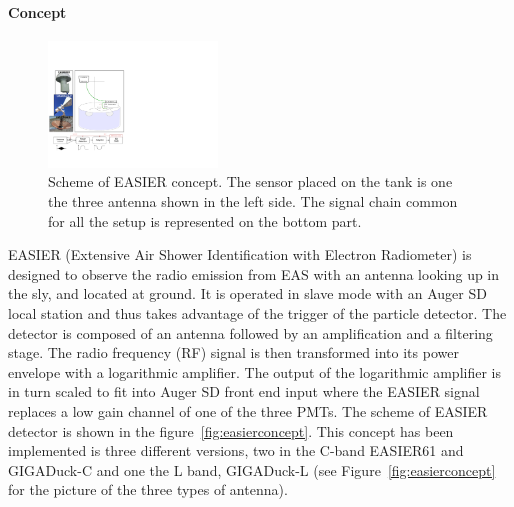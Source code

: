 \documentclass{PoS}
\begin{document}
\paragraph{Concept}
\begin{figure}
	  \begin{center}
\includegraphics[width=0.4\textwidth]{easierscheme.pdf}
	  \end{center}
  \label{fig:easierscheme}
  \caption{Scheme of EASIER concept. The sensor  placed on the tank is one the three antenna shown in the left side. The signal chain common for all the setup is represented on the bottom part.}
\end{figure}

EASIER (Extensive Air Shower Identification with Electron Radiometer) is designed to observe the radio emission from EAS with an antenna looking up in the sly, and located at ground. It is operated in slave mode with an Auger SD local station and thus takes advantage of the trigger of the particle detector. The detector is composed of an antenna followed by an amplification and a filtering stage. The radio frequency (RF) signal is then transformed into its power envelope with a logarithmic amplifier. The output of the logarithmic amplifier is in turn scaled to fit into Auger SD front end input where the EASIER signal replaces a low gain channel of one of the three PMTs. 
The scheme of EASIER detector is shown in the figure~\ref{fig:easierconcept}. This concept has been implemented is three different versions, two in the C-band EASIER61 and GIGADuck-C and one the L band, GIGADuck-L (see Figure~\ref{fig:easierconcept} for the picture of the three types of antenna).

\end{document}
